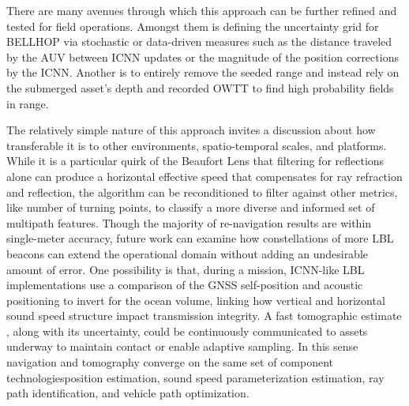 \documentclass[preprint,TurnOnLineNumbers]{JASA}
\newcommand{\llabel}[1]{\hypertarget{llineno:#1}{\linelabel{#1}}}
\begin{document}
There are many avenues through which this approach can be further refined and tested for field operations.
Amongst them is defining the uncertainty grid for BELLHOP via stochastic or data-driven measures such as the distance traveled by the AUV between ICNN updates or the magnitude of the position corrections by the ICNN.
Another is to entirely remove the seeded range and instead rely on the submerged asset's depth and recorded OWTT to find high probability fields in range.

The relatively simple nature of this approach invites a discussion about how transferable it is to other environments, spatio-temporal scales, and platforms.
While it is a particular quirk of the Beaufort Lens that filtering for reflections alone can produce a horizontal effective speed that compensates for ray refraction and reflection, the algorithm can be reconditioned to filter against other metrics, like number of turning points, to classify a more diverse and informed set of multipath features.
Though the majority of re-navigation results are within single-meter accuracy, future work can examine how constellations of more LBL beacons can extend the operational domain without adding an undesirable amount of error.
One possibility is that, during a mission, ICNN-like LBL implementations use a comparison of the GNSS self-position and acoustic positioning to invert for the ocean volume, linking how vertical and horizontal sound speed structure impact transmission integrity.
\llabel{1.20} A fast tomographic estimate \citep{deffenbaugh_optimal_1997,Elisseeff2002}, along with its uncertainty, could be continuously communicated to assets underway to maintain contact or enable adaptive sampling.
In this sense navigation and tomography converge on the same set of component technologies\textemdash position estimation, sound speed parameterization estimation, ray path identification, and vehicle path optimization.
\end{document}
